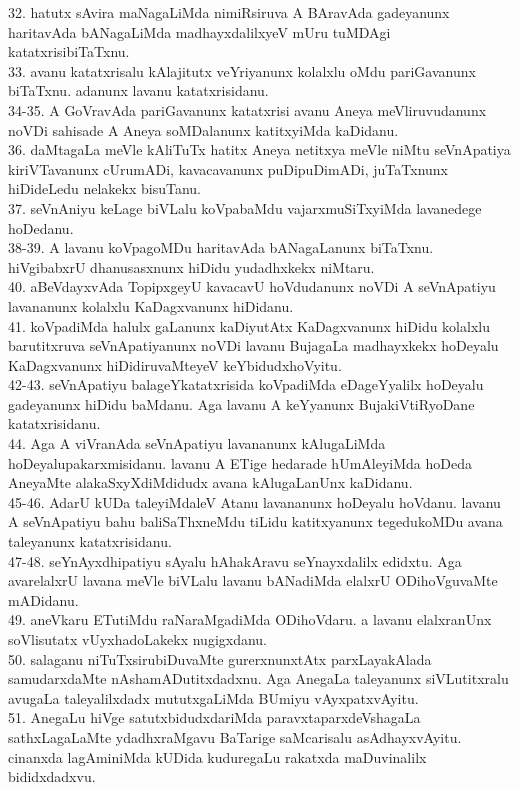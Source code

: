 \documentclass{article}
\begin{document}
32. hatutx sAvira maNagaLiMda nimiRsiruva A BAravAda gadeyanunx haritavAda bANagaLiMda madhayxdalilxyeV mUru tuMDAgi katatxrisibiTaTxnu.\\
33. avanu katatxrisalu kAlajitutx veYriyanunx kolalxlu oMdu pariGavanunx biTaTxnu. adanunx lavanu katatxrisidanu.\\
34-35. A GoVravAda pariGavanunx katatxrisi avanu Aneya meVliruvudanunx noVDi sahisade A Aneya soMDalanunx katitxyiMda kaDidanu.\\
36. daMtagaLa meVle kAliTuTx hatitx Aneya netitxya meVle niMtu seVnApatiya kiriVTavanunx cUrumADi, kavacavanunx puDipuDimADi, juTaTxnunx hiDideLedu nelakekx bisuTanu.\\
37. seVnAniyu keLage biVLalu koVpabaMdu vajarxmuSiTxyiMda lavanedege hoDedanu.\\
38-39. A lavanu koVpagoMDu haritavAda bANagaLanunx biTaTxnu. hiVgibabxrU dhanusasxnunx hiDidu yudadhxkekx niMtaru.\\
40. aBeVdayxvAda TopipxgeyU kavacavU hoVdudanunx noVDi A seVnApatiyu lavananunx kolalxlu KaDagxvanunx hiDidanu.\\
41. koVpadiMda halulx gaLanunx kaDiyutAtx KaDagxvanunx hiDidu kolalxlu barutitxruva seVnApatiyanunx noVDi lavanu BujagaLa madhayxkekx hoDeyalu KaDagxvanunx hiDidiruvaMteyeV keYbidudxhoVyitu.\\
42-43. seVnApatiyu balageYkatatxrisida koVpadiMda eDageYyalilx hoDeyalu gadeyanunx hiDidu baMdanu. Aga lavanu A keYyanunx BujakiVtiRyoDane katatxrisidanu.\\
44. Aga A viVranAda seVnApatiyu lavananunx kAlugaLiMda hoDeyalupakarxmisidanu. lavanu A ETige hedarade hUmAleyiMda hoDeda AneyaMte alakaSxyXdiMdidudx avana kAlugaLanUnx kaDidanu.\\
45-46. AdarU kUDa taleyiMdaleV Atanu lavananunx hoDeyalu hoVdanu. lavanu A seVnApatiyu bahu baliSaThxneMdu tiLidu katitxyanunx tegedukoMDu avana taleyanunx katatxrisidanu.\\
47-48. seYnAyxdhipatiyu sAyalu hAhakAravu seYnayxdalilx edidxtu. Aga avarelalxrU lavana meVle biVLalu lavanu bANadiMda elalxrU ODihoVguvaMte mADidanu.\\
49. aneVkaru ETutiMdu raNaraMgadiMda ODihoVdaru. a lavanu elalxranUnx soVlisutatx vUyxhadoLakekx nugigxdanu.\\
50. salaganu niTuTxsirubiDuvaMte gurerxnunxtAtx parxLayakAlada samudarxdaMte nAshamADutitxdadxnu. Aga AnegaLa taleyanunx siVLutitxralu avugaLa taleyalilxdadx mututxgaLiMda BUmiyu vAyxpatxvAyitu.\\
51. AnegaLu hiVge satutxbidudxdariMda paravxtaparxdeVshagaLa sathxLagaLaMte ydadhxraMgavu BaTarige saMcarisalu asAdhayxvAyitu. cinanxda lagAminiMda kUDida kuduregaLu rakatxda maDuvinalilx bididxdadxvu.\\
\end{document}
